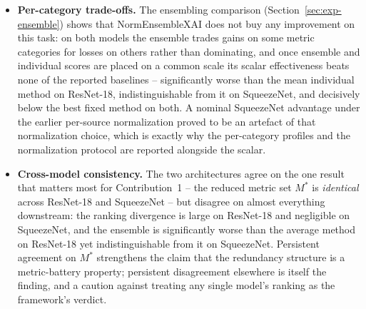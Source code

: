 \begin{itemize}
    measured, the MQ-discounted ordering departs substantially from
    Autoweighted on
    ResNet-18 ($\rho = 0.46$: LRP rises from fifth into a statistical tie
    with Occlusion at the top -- the top-2 \emph{set} is stable in every
    jackknife replicate but not under every $\pm0.2$ reliability shift,
    and their mutual order is unresolved throughout -- and
    Grad-CAM
    falls into the bottom cluster) while SqueezeNet moves only mildly
    ($\rho = 0.96$); the mean effectiveness shift is $|\Delta|\approx0.14$
    on ResNet-18 and $0.06$ on SqueezeNet.
    Mechanically, the discount redistributes weight toward the
    high-reliability metrics (sparseness $r_k = 0.97$, max-sensitivity
    $0.96$, pixel-flipping $0.88$) and away from
    random-logit ($0.63$ -- near-perfect noise resilience but reactivity at
    the noise floor, the textbook stable-but-insensitive case),
    faithfulness-correlation ($0.58$), and relevance-mass
    accuracy ($0.55$). The discount is therefore a consequential modelling
    choice on one architecture and nearly inert on the other -- the same
    conditional pattern as the uniform-vs-Autoweighted comparison
    (Section~\ref{sec:disc-redundancy}).
    \item \textbf{Per-category trade-offs.} The ensembling comparison
    (Section~\ref{sec:exp-ensemble}) shows that NormEnsembleXAI does not buy
    any improvement on this task: on both models the ensemble trades gains on
    some metric
    categories for losses on others rather than dominating, and once ensemble
    and individual scores are placed on a common scale its scalar
    effectiveness beats none of the reported baselines -- significantly worse
    than the mean individual method on ResNet-18, indistinguishable from it
    on SqueezeNet, and decisively below the best fixed method on both. A
    nominal SqueezeNet advantage under the earlier per-source normalization
    proved to be an artefact of that normalization choice, which is exactly
    why the per-category profiles and the normalization protocol are reported
    alongside the scalar.
    \item \textbf{Cross-model consistency.} The two architectures agree on the
    one result that matters most for Contribution~1 -- the reduced metric set
    $M^{*}$ is \emph{identical} across ResNet-18 and SqueezeNet -- but disagree on
    almost everything downstream: the ranking divergence is large on ResNet-18
    and negligible on SqueezeNet, and the ensemble is significantly worse than
    the average method on ResNet-18 yet indistinguishable from it
    on SqueezeNet. Persistent agreement on $M^{*}$ strengthens the claim that the
    redundancy structure is a metric-battery property; persistent disagreement
    elsewhere is itself the finding, and a caution against treating any single
    model's ranking as the framework's verdict.
\end{itemize}

